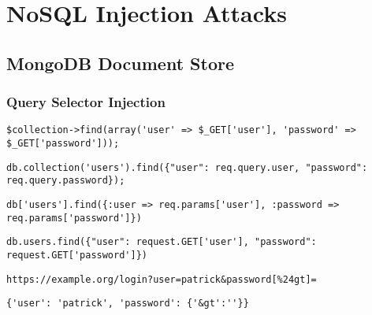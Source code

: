\chapter{NoSQL Injection Attacks}


\section{MongoDB Document Store}

\subsection{Query Selector Injection}

\begin{lstlisting}[caption={Vulnerable PHP example for query selector injection on MongoDB}, label={lst:PHPArrayInjection}]
$collection->find(array('user' => $_GET['user'], 'password' => $_GET['password']));
\end{lstlisting}

\begin{lstlisting}[caption={Vulnerable NodeJS example for query selector injection on MongoDB}, label={lst:PHPArrayInjection}]
db.collection('users').find({"user": req.query.user, "password": req.query.password});
\end{lstlisting}

\begin{lstlisting}[caption={Vulnerable Ruby example for query selector injection on MongoDB}, label={lst:PHPArrayInjection}]
db['users'].find({:user => req.params['user'], :password => req.params['password']})
\end{lstlisting}

\begin{lstlisting}[caption={Vulnerable Python example for query selector injection on MongoDB}, label={lst:PHPArrayInjection}]
db.users.find({"user": request.GET['user'], "password": request.GET['password']})
\end{lstlisting}

\begin{lstlisting}[caption={Attack vector on MongoDB for query selector injection via HTTP GET}, label={lst:PHPArrayInjection}]
https://example.org/login?user=patrick&password[%24gt]=
\end{lstlisting}

\begin{lstlisting}[caption={Resulting query of query selector injection}, label={lst:PHPArrayParam}]
{'user': 'patrick', 'password': {'&gt':''}}
\end{lstlisting}

